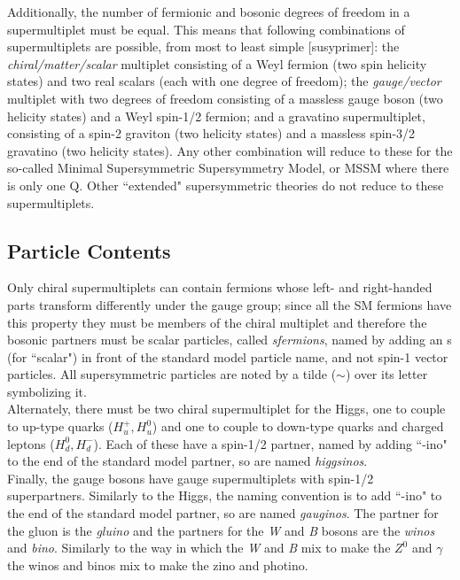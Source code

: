 Additionally, the number of fermionic and bosonic degrees of freedom in a supermultiplet must be equal.  This means that following combinations of supermultiplets are possible, from most to least simple [susyprimer]: the \textit{chiral/matter/scalar} multiplet consisting of a Weyl fermion (two spin helicity states) and two real scalars (each with one degree of freedom); the \textit{gauge/vector} multiplet with two degrees of freedom consisting of a massless gauge boson (two helicity states) and a Weyl spin-1/2 fermion; and a gravatino supermultiplet, consisting of a spin-2 graviton (two helicity states) and a massless spin-3/2 gravatino (two helicity states).  Any other combination will reduce to these for the so-called Minimal Supersymmetric Supersymmetry Model, or MSSM where there is only one Q.  Other ``extended" supersymmetric theories do not reduce to these supermultiplets.  \\

\subsection{Particle Contents}

Only chiral supermultiplets can contain fermions whose left- and right-handed parts transform differently under the gauge group; since all the SM fermions have this property they must be members of the chiral multiplet and therefore the bosonic partners must be scalar particles, called \textit{sfermions}, named by adding an s (for ``scalar") in front of the standard model particle name, and not spin-1 vector particles.  All supersymmetric particles are noted by a tilde ($\sim$) over its letter symbolizing it. \\

Alternately, there must be two chiral supermultiplet for the Higgs, one to couple to up-type quarks ($H_u^+ , H_u^0$) and one to couple to down-type quarks and charged leptons ($H_d^0, H_d^-$).  Each of these have a spin-1/2 partner, named by adding ``-ino" to the end of the standard model partner, so are named \textit{higgsinos}.  \\

Finally, the gauge bosons  have gauge supermultiplets with spin-1/2 superpartners.  Similarly to the Higgs, the naming convention is to add ``-ino" to the end of the standard model partner, so are named \textit{gauginos}.  The partner for the gluon is the \textit{gluino} and the partners for the \textit{W} and \textit{B} bosons are the \textit{winos} and \textit{bino}.  Similarly to the way in which the \textit{W} and \textit{B} mix to make the $Z^0$ and $\gamma$ the winos and binos mix to make the zino and photino.  \\



